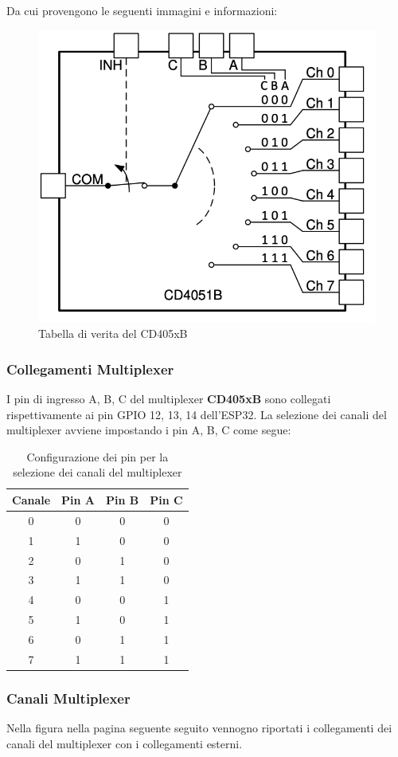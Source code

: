 \documentclass[12pt,a4paper]{report}
\begin{document}
Da cui provengono le seguenti immagini e informazioni:
\begin{figure}[H]
    \centering
    \includegraphics[width=0.5\linewidth]{../image/CD405xB.png}
    \caption{Tabella di verita del CD405xB}
\end{figure}

\subsubsection{Collegamenti Multiplexer}

I pin di ingresso A, B, C del multiplexer \textbf{CD405xB} sono collegati rispettivamente ai pin GPIO 12, 13, 14 dell'ESP32. La selezione dei canali del multiplexer avviene impostando i pin A, B, C come segue:

\begin{table}[H]
    \centering
    \begin{tabular}{|c|c|c|c|}
        \hline
        \textbf{Canale} & \textbf{Pin A} & \textbf{Pin B} & \textbf{Pin C} \\ \hline
        0 & 0 & 0 & 0 \\ \hline
        1 & 1 & 0 & 0 \\ \hline
        2 & 0 & 1 & 0 \\ \hline
        3 & 1 & 1 & 0 \\ \hline
        4 & 0 & 0 & 1 \\ \hline
        5 & 1 & 0 & 1 \\ \hline
        6 & 0 & 1 & 1 \\ \hline
        7 & 1 & 1 & 1 \\ \hline
    \end{tabular}
    \caption{Configurazione dei pin per la selezione dei canali del multiplexer}
\end{table}

\subsubsection{Canali Multiplexer}
Nella figura nella pagina seguente seguito vennogno riportati i collegamenti dei canali del multiplexer con i collegamenti esterni. 
\end{document}
